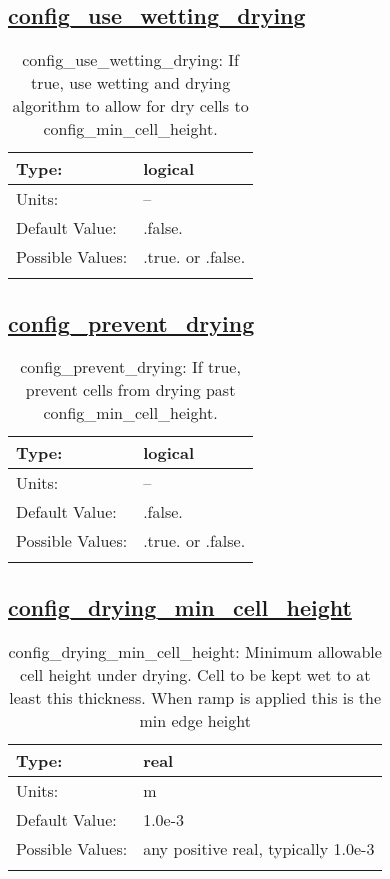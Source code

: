 \subsection[config\_use\_wetting\_drying]{\hyperref[sec:nm_tab_wetting_drying]{config\_use\_wetting\_drying}}
\label{subsec:nm_sec_config_use_wetting_drying}
\begin{center}
\begin{longtable}{| p{2.0in} || p{4.0in} |}
    \hline
    Type: & logical \\
    \hline
    Units: & -- \\
    \hline
    Default Value: & .false. \\
    \hline
    Possible Values: & .true. or .false. \\
    \hline
    \caption{config\_use\_wetting\_drying: If true, use wetting and drying algorithm to allow for dry cells to config\_min\_cell\_height.}
\end{longtable}
\end{center}
\subsection[config\_prevent\_drying]{\hyperref[sec:nm_tab_wetting_drying]{config\_prevent\_drying}}
\label{subsec:nm_sec_config_prevent_drying}
\begin{center}
\begin{longtable}{| p{2.0in} || p{4.0in} |}
    \hline
    Type: & logical \\
    \hline
    Units: & -- \\
    \hline
    Default Value: & .false. \\
    \hline
    Possible Values: & .true. or .false. \\
    \hline
    \caption{config\_prevent\_drying: If true, prevent cells from drying past config\_min\_cell\_height.}
\end{longtable}
\end{center}
\subsection[config\_drying\_min\_cell\_height]{\hyperref[sec:nm_tab_wetting_drying]{config\_drying\_min\_cell\_height}}
\label{subsec:nm_sec_config_drying_min_cell_height}
\begin{center}
\begin{longtable}{| p{2.0in} || p{4.0in} |}
    \hline
    Type: & real \\
    \hline
    Units: & \si{m} \\
    \hline
    Default Value: & 1.0e-3 \\
    \hline
    Possible Values: & any positive real, typically 1.0e-3 \\
    \hline
    \caption{config\_drying\_min\_cell\_height: Minimum allowable cell height under drying.  Cell to be kept wet to at least this thickness. When ramp is applied this is the min edge height}
\end{longtable}
\end{center}

